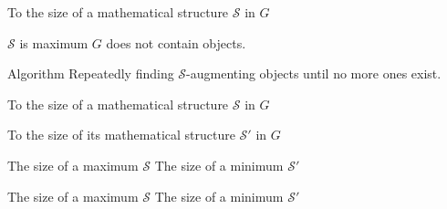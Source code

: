 
\begin{frame}

  \begin{center}
  \end{center}
\end{frame}

\begin{frame}{}
  \begin{center}
    To  the size of a mathematical structure $\mathcal{S}$ in $G$

    \vspace{0.30cm}

    \pause
    \vspace{0.30cm}
    \begin{theorem}
      $\mathcal{S}$ is maximum  $G$ does not contain  objects.
    \end{theorem}

    \pause
    \vspace{0.30cm}
    \begin{exampleblock}{Algorithm}
      Repeatedly finding $\mathcal{S}$-augmenting objects until no more ones exist.
    \end{exampleblock}
  \end{center}
\end{frame}

\begin{frame}{}
  \begin{center}
    To  the size of a mathematical structure $\mathcal{S}$ in $G$

    \vspace{0.30cm}

    \pause
    \vspace{0.30cm}
    To  the size of its  mathematical structure $\mathcal{S}'$ in $G$

    \pause
    \vspace{0.30cm}
    \begin{theorem}
      The size of a maximum $\mathcal{S}$ \red{$\le$} The size of a minimum $\mathcal{S'}$
    \end{theorem}

    \pause
    \vspace{0.30cm}
    \begin{theorem}
      The size of a maximum $\mathcal{S}$ \red{=} The size of a minimum $\mathcal{S'}$
    \end{theorem}
  \end{center}
\end{frame}
